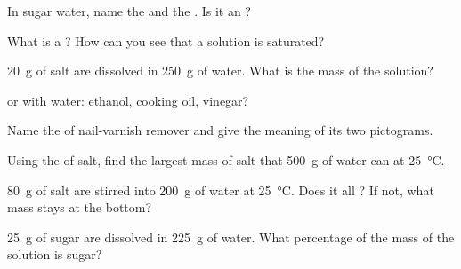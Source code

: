 \begin{exercise}[$\star$]\label{exo:g6:solutions-and-solubility:1}
In sugar water, name the  and the . Is it an ?
\end{exercise}

\begin{exercise}[$\star$]\label{exo:g6:solutions-and-solubility:2}
What is a ? How can you see that a solution is
saturated?
\end{exercise}

\begin{exercise}[$\star$]\label{exo:g6:solutions-and-solubility:3}
\qty{20}{g} of salt are dissolved in \qty{250}{g} of water. What is the
mass of the solution?
\end{exercise}

\begin{exercise}[$\star$]\label{exo:g6:solutions-and-solubility:4}
 or  with water: ethanol, cooking oil, vinegar?
\end{exercise}

\begin{exercise}[$\star$]\label{exo:g6:solutions-and-solubility:5}
Name the  of nail-varnish remover and give the meaning of its two
pictograms.
\end{exercise}

\begin{exercise}[$\star\star$]\label{exo:g6:solutions-and-solubility:6}
Using the  of salt, find the largest mass of salt that
\qty{500}{g} of water can  at \qty{25}{\celsius}.
\end{exercise}

\begin{exercise}[$\star\star$]\label{exo:g6:solutions-and-solubility:7}
\qty{80}{g} of salt are stirred into \qty{200}{g} of water at
\qty{25}{\celsius}. Does it all ? If not, what mass stays at the
bottom?
\end{exercise}

\begin{exercise}[$\star\star$]\label{exo:g6:solutions-and-solubility:8}
\qty{25}{g} of sugar are dissolved in \qty{225}{g} of water. What
percentage of the mass of the solution is sugar?
\end{exercise}

